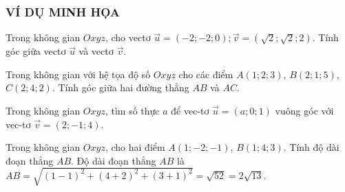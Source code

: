 \subsubsection{VÍ DỤ MINH HỌA}
\begin{vd}%
	Trong không gian $Oxyz$, cho vectơ $\overrightarrow{u}=\left(-2;-2;0\right); \overrightarrow{v}=(\sqrt{2};\sqrt{2};2)$. Tính góc giữa vectơ $\overrightarrow{u}$ và vectơ $\overrightarrow{v}$.
\end{vd}
\begin{vd}%
	Trong không gian với hệ tọa độ số $ Oxyz$ cho các điểm $A\left(1; 2; 3\right)$, $B\left(2; 1; 5\right)$, $C\left(2; 4; 2\right)$. Tính góc giữa hai đường thẳng $AB$ và $AC$.
\end{vd}
\begin{vd}%
	Trong không gian $Oxyz$, tìm số thực $a$ để vec-tơ $\overrightarrow{u}=(a;0;1)$ vuông góc với vec-tơ $\overrightarrow{v}=(2;-1;4)$.
\end{vd}
\begin{vd}%
	Trong không gian $Oxyz$, cho hai điểm $A(1; -2; -1)$, $B(1; 4; 3)$. Tính độ dài đoạn thẳng $AB$.
	\loigiai
	{Độ dài đoạn thẳng $AB$ là $AB=\sqrt{(1-1)^2+(4+2)^2+(3+1)^2}=\sqrt{52}=2\sqrt{13}$.	
	}
\end{vd}
